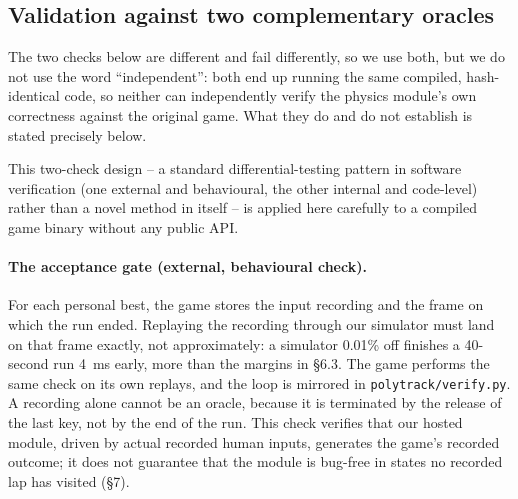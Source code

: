 \documentclass[11pt]{article}
\begin{document}
\subsection{Validation against two complementary oracles}

The two checks below are different and fail differently, so we use both, but we do not use the word ``independent'': both end up running the same compiled, hash-identical code, so neither can independently verify the physics module's own correctness against the original game. What they do and do not establish is stated precisely below.

This two-check design -- a standard differential-testing pattern in software verification (one external and behavioural, the other internal and code-level) rather than a novel method in itself -- is applied here carefully to a compiled game binary without any public API.

\paragraph{The acceptance gate (external, behavioural check).} For each personal best, the game stores the input recording and the frame on which the run ended. Replaying the recording through our simulator must land on that frame exactly, not approximately: a simulator 0.01\% off finishes a 40-second run 4~ms early, more than the margins in \S6.3. The game performs the same check on its own replays, and the loop is mirrored in \texttt{polytrack/verify.py}. A recording alone cannot be an oracle, because it is terminated by the release of the last key, not by the end of the run. This check verifies that our hosted module, driven by actual recorded human inputs, generates the game's recorded outcome; it does not guarantee that the module is bug-free in states no recorded lap has visited (\S7).
\end{document}
